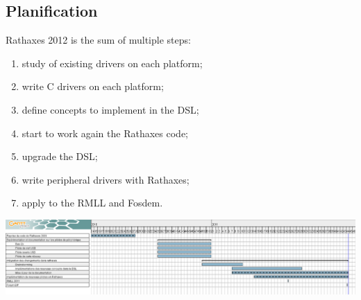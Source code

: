 \subsection{Planification}

Rathaxes 2012 is the sum of multiple steps:

\begin{enumerate}
\item study of existing drivers on each platform;
\item write C drivers on each platform;
\item define concepts to implement in the DSL;
\item start to work again the Rathaxes code;
\item upgrade the DSL;
\item write peripheral drivers with Rathaxes;
\item apply to the RMLL and Fosdem.
\end{enumerate}

\begin{center}

\includegraphics[angle=90,scale=0.35]{../images/gantt}

\end{center}

